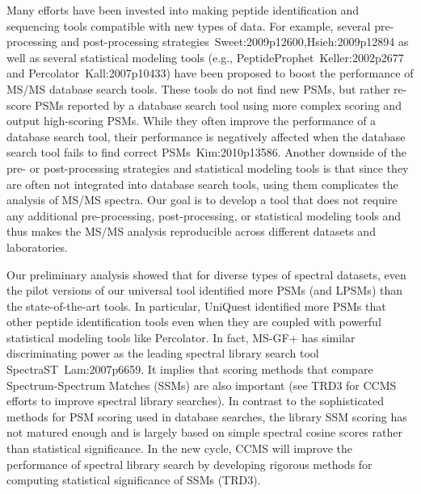 Many efforts have been invested into making peptide identification and sequencing  tools compatible with new types of data. 
For example, several pre-processing and post-processing strategies~\cite{unv}{Sweet:2009p12600,Hsieh:2009p12894} as well as several 
statistical modeling tools (e.g., PeptideProphet~\cite{unv}{Keller:2002p2677}
and Percolator~\cite{unv}{Kall:2007p10433}) have been proposed to boost the performance of  MS/MS database search tools. 
These tools do not find new PSMs,
but rather re-score PSMs reported by a database search tool using more complex scoring
and output high-scoring PSMs.
While they often improve  the
performance of a database search tool,  their performance
is negatively affected when the database search tool fails to find correct PSMs~\cite{unv}{Kim:2010p13586}. 
Another downside of the pre- or post-processing strategies
and statistical modeling tools is that since they are often not
integrated into database search tools, using them complicates the
analysis of MS/MS spectra. Our goal is to develop a tool that does not require any additional pre-processing, post-processing, or statistical modeling tools and thus makes the MS/MS analysis reproducible across different datasets and laboratories.  





Our preliminary analysis showed that for diverse types of spectral datasets, even the pilot versions of our universal tool identified more PSMs (and LPSMs)  than the state-of-the-art tools. In particular, UniQuest identified more PSMs that other peptide identification tools even when they are coupled with powerful 
 statistical modeling tools like  Percolator.
In fact, MS-GF+ has similar discriminating power as the leading spectral library search tool SpectraST~\cite{unv}{Lam:2007p6659}.
%
It implies that scoring methods that compare Spectrum-Spectrum Matches (SSMs) are also important (see TRD3 for CCMS efforts to improve spectral library searches).  
In contrast to the sophisticated methods for PSM scoring used in database searches,
the library SSM scoring has not matured enough and is largely based on simple spectral cosine scores rather than statistical significance.
In the new cycle, CCMS will improve the performance of spectral library search  by developing rigorous methods for computing statistical significance of SSMs (TRD3).

